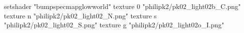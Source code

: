 setshader "bumpspecmapglowworld"
    texture 0 "philipk2/pk02_light02b_C.png"
    texture n "philipk2/pk02_light02_N.png"
    texture s "philipk2/pk02_light02_S.png"
    texture g "philipk2/pk02_light02o_I.png"